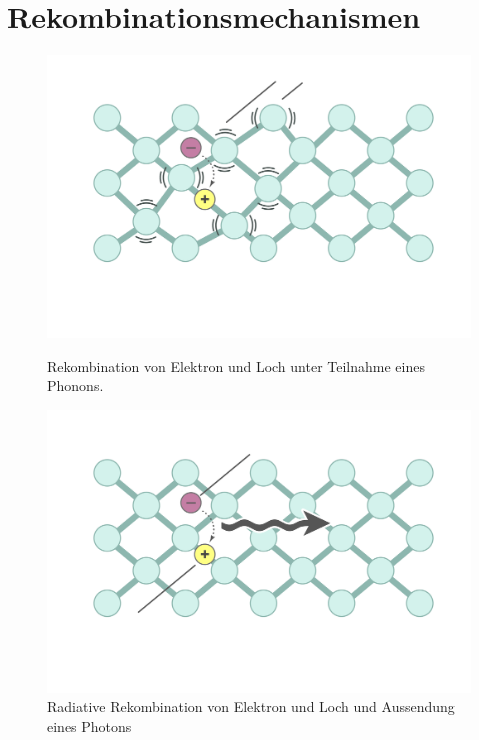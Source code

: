 
\thispagestyle{fancy}


\section{Rekombinationsmechanismen}

\begin{figure}[htb]
    \centering
    \begin{minipage}[t]{0.49\linewidth}
        \centering
        \includegraphics[width=\linewidth]{Bilder/nonradRekomb.png}
        \caption{Rekombination von Elektron und Loch unter Teilnahme eines Phonons.}
    \end{minipage}%
    \hfill
    \begin{minipage}[t]{0.49\linewidth}
        \centering
        \includegraphics[width=\linewidth]{Bilder/radRekomb.png}
        \caption{Radiative Rekombination von Elektron und Loch und Aussendung eines Photons}
    \end{minipage}
\end{figure}

